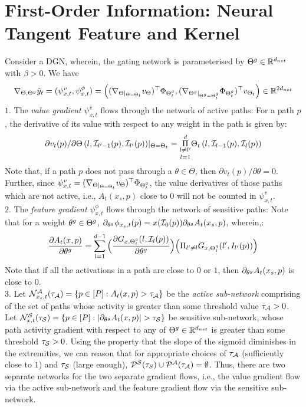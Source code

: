 \section{First-Order Information: Neural Tangent Feature and Kernel}
Consider a DGN, wherein, the gating network is parameterised by $\Tg\inrdnet$ with $\beta>0$.  We have 
\begin{align}\nabla_{\Theta,\Tg}\hat{y}_t=(\psi^v_{x,t}, \psi^{\phi}_{x,t})=\left((\nabla_{\Theta|_{\Theta=\Theta_t}}v_{\Theta})^\top \Phi_{\Tg_t}, (\nabla_{\Tg|_{\Tg=\Tg_t}}\Phi_{\Tg_t})^\top v_{\Theta_t}\right)\in \R^{2d_{net}}
\end{align}
$1.$ The \emph{value gradient}  $\psi^v_{x,t}$ flows through the network of active paths: For a path $p$, the derivative of its value with respect to any weight in the path is given by:\\
\begin{align}\label{eq:vft}{\partial v_t(p)}/{\partial \Theta\left(l,\I_{l'-1}(p),\I_{l'}(p)\right)}|_{\Theta=\Theta_t}= \underset{l=1}{\underset{l\neq l'}{\overset{d}{\Pi}}} \Theta_t\left(l,\I_{l-1}(p),\I_{l}(p)\right)
\end{align}
Note that, if a path $p$ does not pass through a $\theta\in\Theta$, then ${\partial v_t(p)}/{\partial \theta}=0$. Further, since $\psi^v_{x,t}=(\nabla_{\Theta|_{\Theta=\Theta_t}}v_{\Theta})^\top \Phi_{\Tg_t}$, the value derivatives of those paths which are not active, i.e., $A_t(x_s,p)$ close to $0$ will not be counted in $\psi^v_{x,t}$.\\
$2.$ The \emph{feature gradient}  $\psi^{\phi}_{x,t}$ flows through the network of sensitive paths: Note that for a weight $\tg\in \Tg$, $\partial_{\tg} \phi_{x_s,t}(p) = x(\I_0(p))\partial_{\tg} A_t(x_s,p)$, wherein,:\\
\begin{align}
\frac{\partial A_{t}(x,p)}{\partial \tg}= \sum_{l=1}^{d-1} \Big(\frac{\partial G_{x,\Tg_t}(l,\I_l(p))}{\partial \tg} \Big)\Big(\Pi_{l'\neq l} G_{x,\Tg_t}(l',I_{l'}(p))\Big)
\end{align}
Note that if all the activations in a path are close to $0$ or $1$, then $\partial_{\tg} A_t(x_s,p)$ is close to $0$.\\
$3.$ Let $\N^{\A}_{x_s,t}(\tau_{\A})=\{p\in[P]:A_t(x,p)>\tau_{\A}\}$ be the \emph{active sub-network} comprising of the set of paths whose activity is greater than some threshold value $\tau_{\A}>0$. Let $\N^{\S}_{x,t}(\tau_{\S})=\{p\in[P]: |\partial_{\tg} A_t(x,p)|>\tau_{\S}\}$ be sensitive sub-network, whose path activity gradient with respect to any of $\Tg\inrdnet$ is greater than some threshold $\tau_{\S}>0$. Using the property that the slope of the sigmoid diminishes in the extremities, we can reason that for appropriate choices of $\tau_{\A}$ (sufficiently close to $1$) and $\tau_{\S}$ (large enough), $\P^{\S}(\tau_{S})\cup \P^{\A}(\tau_{\A})=\emptyset$. Thus, there are two separate networks for the two separate gradient flows, i.e., the value gradient flow via the active sub-network and the feature gradient flow via the sensitive sub-network.\\

